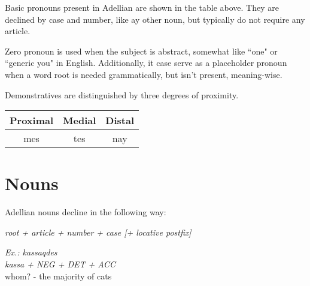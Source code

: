 \documentclass[12pt]{article}
\newcommand{\example}[3]{
	\colorbox{light-gray}{
		\parbox{5in}{
			\emph{Ex.: #1}\\
				  \emph{#2}\\
				  #3
		  }
	}
}
\begin{document}
	Basic pronouns present in Adellian are shown in the table above. They are declined by case and number, like ay other noun, but typically do not require any article.
	
	Zero pronoun is used when the subject is abstract, somewhat like ``one" or ``generic you" in English. Additionally, it case serve as a placeholder pronoun when a word root is needed grammatically, but isn't present, meaning-wise.

	Demonstratives are distinguished by three degrees of proximity.

	\begin{tabular}{|| c c c ||}
		\hline
		Proximal & Medial & Distal \\
		\hline
		mes & tes &  nay \\
		\hline
	\end{tabular}

	\section{Nouns}
	
	Adellian nouns decline in the following way:
	
	\emph{root + article + number + case [+ locative postfix]}
	
	\example{kassaqdes}
			 {kassa + NEG + DET + ACC}
		 	 {whom? - the majority of cats}
	
\end{document}
